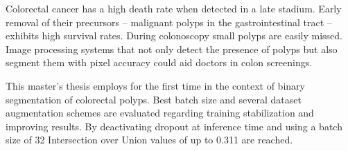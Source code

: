 Colorectal cancer has a high death rate when detected in a late stadium.
Early removal of their precursors -- malignant polyps in the gastrointestinal tract -- exhibits high survival rates.
During colonoscopy small polyps are easily missed.
Image processing systems that not only detect the presence of polyps but also segment them with pixel accuracy could aid doctors in colon screenings.

This master's thesis employs  for the first time in the context of binary segmentation of colorectal polyps.
Best batch size and several dataset augmentation schemes are evaluated regarding training stabilization and improving results.
By deactivating dropout at inference time and using a batch size of 32 Intersection over Union values of up to 0.311 are reached.
